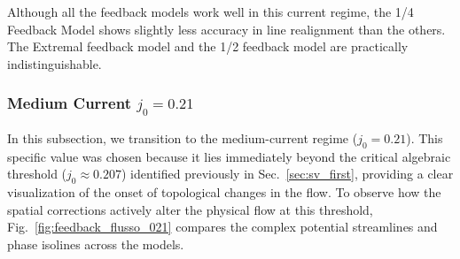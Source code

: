 \documentclass[english,binding=0.6cm,noexaminfo]{sapthesis}
\begin{document}
Although all the feedback models work well in this current regime, the 1/4 Feedback Model shows slightly less accuracy in line realignment than the others. The Extremal feedback model and the 1/2 feedback model are practically indistinguishable.

\subsubsection{Medium Current $j_0=0.21$}
\label{sec:medium_current}
In this subsection, we transition to the medium-current regime ($j_0=0.21$). This specific value was chosen because it lies immediately beyond the critical algebraic threshold ($j_0 \approx 0.207$) identified previously in Sec.~\ref{sec:sv_first}, providing a clear visualization of the onset of topological changes in the flow. To observe how the spatial corrections actively alter the physical flow at this threshold, Fig.~\ref{fig:feedback_flusso_021} compares the complex potential streamlines and phase isolines across the models.
\end{document}
